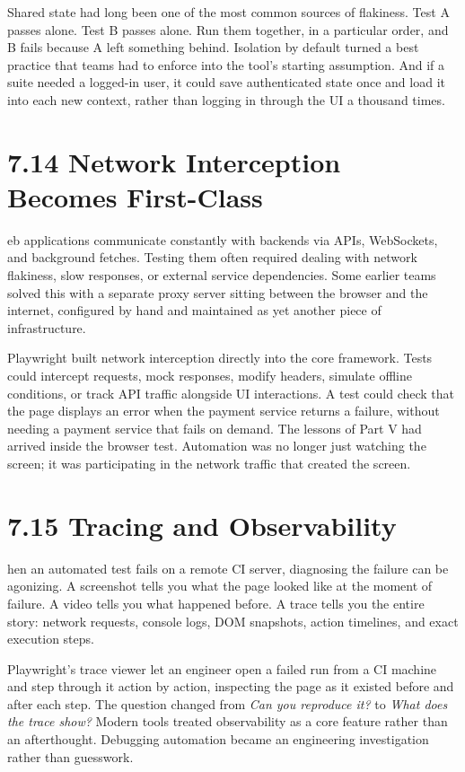 \documentclass[11pt, a4paper, openany]{book}
\newcommand{\initialcap}[1]{{\fontfamily{lmss}\selectfont\huge\textbf{#1}}}
\begin{document}
Shared state had long been one of the most common sources of flakiness. Test A passes alone. Test B passes alone. Run them together, in a particular order, and B fails because A left something behind. Isolation by default turned a best practice that teams had to enforce into the tool's starting assumption. And if a suite needed a logged-in user, it could save authenticated state once and load it into each new context, rather than logging in through the UI a thousand times.

\section{7.14 Network Interception Becomes First-Class}
\noindent \initialcap{W}eb applications communicate constantly with backends via APIs, WebSockets, and background fetches. Testing them often required dealing with network flakiness, slow responses, or external service dependencies. Some earlier teams solved this with a separate proxy server sitting between the browser and the internet, configured by hand and maintained as yet another piece of infrastructure.

Playwright built network interception directly into the core framework. Tests could intercept requests, mock responses, modify headers, simulate offline conditions, or track API traffic alongside UI interactions. A test could check that the page displays an error when the payment service returns a failure, without needing a payment service that fails on demand. The lessons of Part V had arrived inside the browser test. Automation was no longer just watching the screen; it was participating in the network traffic that created the screen.

\section{7.15 Tracing and Observability}
\noindent \initialcap{W}hen an automated test fails on a remote CI server, diagnosing the failure can be agonizing. A screenshot tells you what the page looked like at the moment of failure. A video tells you what happened before. A trace tells you the entire story: network requests, console logs, DOM snapshots, action timelines, and exact execution steps.

Playwright's trace viewer let an engineer open a failed run from a CI machine and step through it action by action, inspecting the page as it existed before and after each step. The question changed from \textit{Can you reproduce it?} to \textit{What does the trace show?} Modern tools treated observability as a core feature rather than an afterthought. Debugging automation became an engineering investigation rather than guesswork.
\end{document}

